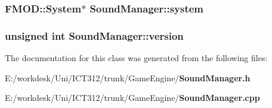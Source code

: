 \subsubsection[{system}]{\setlength{\rightskip}{0pt plus 5cm}F\+M\+O\+D\+::\+System$\ast$ Sound\+Manager\+::system\hspace{0.3cm}{\ttfamily [private]}}\label{class_sound_manager_a1b42e8a68c11d4d6c4b7816181deca32}
\subsubsection[{version}]{\setlength{\rightskip}{0pt plus 5cm}unsigned int Sound\+Manager\+::version\hspace{0.3cm}{\ttfamily [private]}}\label{class_sound_manager_a3d5d3c7d308b7e0b6512613b3eb3a72f}


The documentation for this class was generated from the following files\+:\begin{DoxyCompactItemize}
\item 
E\+:/workdesk/\+Uni/\+I\+C\+T312/trunk/\+Game\+Engine/{\bf Sound\+Manager.\+h}\item 
E\+:/workdesk/\+Uni/\+I\+C\+T312/trunk/\+Game\+Engine/{\bf Sound\+Manager.\+cpp}\end{DoxyCompactItemize}
